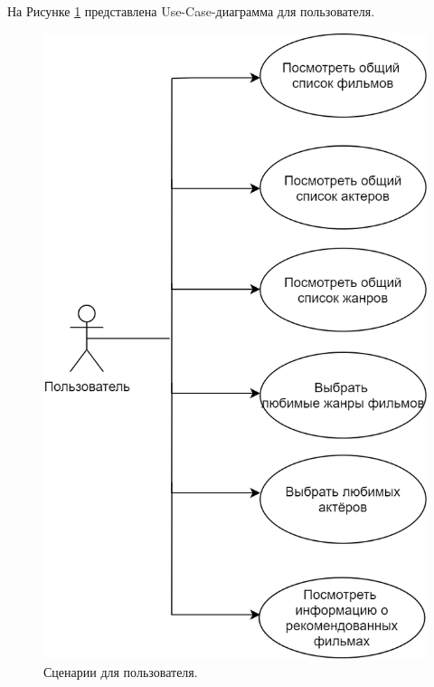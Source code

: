 На Рисунке \ref{img:UseCaseUser} представлена Use-Case-диаграмма для пользователя.
\begin{figure}[h!]
	\centering
	\includegraphics[scale=0.3]{img/UseCaseUser.png}
	\caption{Сценарии для пользователя.}
	\label{img:UseCaseUser}
\end{figure}
\newpage

